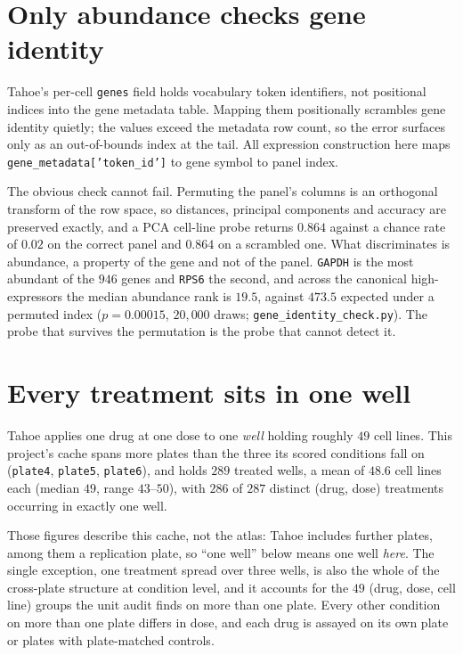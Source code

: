 \section{Only abundance checks gene identity}

Tahoe's per-cell \texttt{genes} field holds vocabulary token identifiers, not
positional indices into the gene metadata table. Mapping them positionally
scrambles gene identity quietly; the values exceed the metadata row count, so
the error surfaces only as an out-of-bounds index at the tail. All expression
construction here maps \texttt{gene\_metadata['token\_id']} to gene symbol to
panel index.

The obvious check cannot fail. Permuting the panel's columns is an orthogonal
transform of the row space, so distances, principal components and accuracy are
preserved exactly, and a PCA cell-line probe returns $0.864$ against a chance
rate of $0.02$ on the correct panel and $0.864$ on a scrambled one. What
discriminates is abundance, a property of the gene and not of the panel.
\texttt{GAPDH} is the most abundant of the $946$ genes and \texttt{RPS6} the
second, and across the canonical high-expressors the median abundance rank is
$19.5$, against $473.5$ expected under a permuted index ($p = 0.00015$,
$20{,}000$ draws; \texttt{gene\_identity\_check.py}). The probe that survives
the permutation is the probe that cannot detect it.

\section{Every treatment sits in one well}

Tahoe applies one drug at one dose to one \emph{well} holding roughly $49$ cell
lines. This project's cache spans more plates than the three its scored
conditions fall on (\texttt{plate4}, \texttt{plate5}, \texttt{plate6}), and
holds $289$ treated wells, a mean of $48.6$ cell lines each (median $49$, range
$43$--$50$), with $286$ of $287$ distinct (drug, dose) treatments occurring in
exactly one well.

Those figures describe this cache, not the atlas: Tahoe includes further plates,
among them a replication plate, so ``one well'' below means one well
\emph{here}. The single exception, one treatment spread over three wells, is
also the whole of the cross-plate structure at condition level, and it accounts
for the $49$ (drug, dose, cell line) groups the unit audit finds on more than
one plate. Every other condition on more than one plate differs in dose, and
each drug is assayed on its own plate or plates with plate-matched controls.

